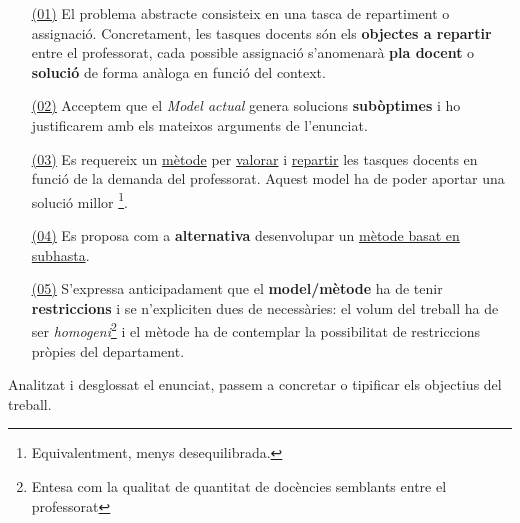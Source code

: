 \documentclass[10pt,twocolumn]{article}
\begin{document}
\begin{itemize}
\item[{ \color{cyan!60} \underline{\underline{\normalcolor (01)}}}] El problema abstracte consisteix en una tasca de repartiment o assignació. Concretament, les tasques docents són els \textbf{objectes a repartir} entre  el professorat, cada possible assignació s'anomenarà \textbf{pla docent} o \textbf{solució} de forma anàloga en funció del context.\\
\item[{ \color{blue!60} \underline{\underline{\normalcolor (02)}}}] Acceptem que el \textit{Model actual} genera solucions \textbf{subòptimes} i ho  justificarem amb els mateixos arguments de l'enunciat.\\
\item[{ \color{green!60} \underline{\underline{\normalcolor (03)}}}] Es requereix un { \color{green!60} \underline{\normalcolor mètode}} per { \color{green!60} \underline{\normalcolor valorar}} i { \color{green!60} \underline{\normalcolor repartir}} les tasques docents en funció de la demanda del professorat. Aquest model ha de poder aportar una solució millor \footnote{Equivalentment, menys desequilibrada.}. 
\item[{ \color{purple!60} \underline{\underline{\normalcolor (04)}}}] Es proposa com a \textbf{alternativa}  desenvolupar un  { \color{purple!60} \underline{\normalcolor mètode basat en subhasta}}.
\item[{ \color{violet!60} \underline{\underline{\normalcolor (05)}}}] S'expressa anticipadament que el \textbf{model/mètode} ha de tenir \textbf{restriccions}  i se n'expliciten dues de necessàries: el volum del treball ha de ser \textit{homogeni}\footnote{Entesa com la qualitat de quantitat de docències semblants entre el professorat} i el mètode ha de contemplar la possibilitat de restriccions pròpies del departament. 
\end{itemize}
Analitzat i desglossat el enunciat, passem a concretar o tipificar els objectius del treball.
\end{document}
